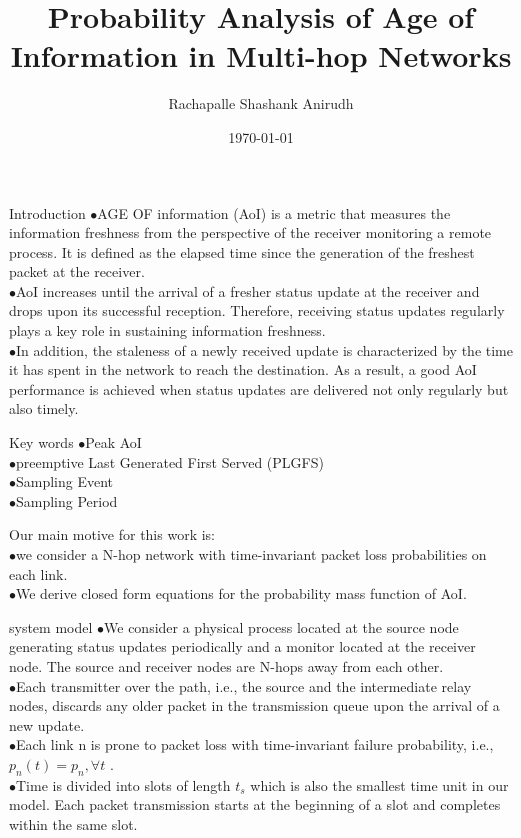 \documentclass{beamer}
\title{Probability Analysis of Age of Information in Multi-hop Networks}
\author{Rachapalle Shashank Anirudh}
\institute{CS20BTECH11040}
\date{\today}
\begin{document}
\begin{frame}{}
 \titlepage 
\end{frame}
\begin{frame}{Introduction}
$\bullet$AGE OF information (AoI) is a metric that measures the
information freshness from the perspective of the receiver
monitoring a remote process. It is defined as the elapsed time
since the generation of the freshest packet at the receiver.\\
$\bullet$AoI increases until the arrival of a fresher status update at the
receiver and drops upon its successful reception. Therefore,
receiving status updates regularly plays a key role in sustaining
information freshness.\\
$\bullet$In addition, the staleness of a newly
received update is characterized by the time it has spent in
the network to reach the destination. As a result, a good AoI
performance is achieved when status updates are delivered not
only regularly but also timely.
\end{frame}

\begin{frame}{Key words}
$\bullet$Peak AoI\\
$\bullet$preemptive Last Generated First Served (PLGFS)\\
$\bullet$Sampling Event\\
$\bullet$Sampling Period\\
\end{frame}

\begin{frame}{}
Our main motive for this work is:\\
$\bullet$we consider a N-hop network with time-invariant packet loss probabilities on each
link.\\
$\bullet$We derive closed form equations for the probability mass
function of AoI.\\
\end{frame}
\begin{frame}{system model}
$\bullet$We consider a physical process located at the source node generating status updates periodically and a monitor located at the receiver node. The source and receiver nodes are N-hops
away from each other.\\
$\bullet$Each transmitter over the path, i.e., the source and the
intermediate relay nodes, discards any older packet in the
transmission queue upon the arrival of a new update. \\
$\bullet$Each link n is prone to packet loss with time-invariant failure probability, i.e.,$p_{n}(t)=p_{n}, \forall t$ . \\
$\bullet$Time is divided into slots of length $t_{s}$ which is also the smallest time unit in our model. Each packet transmission starts at the beginning of a slot and completes within the same slot.\\
\end{frame}
\end{document}
